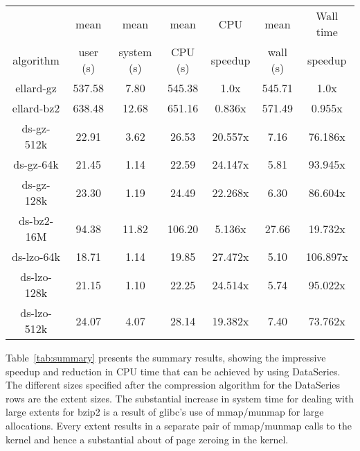 \documentclass{acm_proc_article-sp}
\begin{document}
\begin{table*}
\centering
\begin{tabular}{|c|c|c|c|c|c|c|} \hline
            & mean     & mean       & mean     & CPU     & mean     & Wall time \\
algorithm   & user (s) & system (s) & CPU (s)  & speedup & wall (s) & speedup  \\ \hline
ellard-gz   & 537.58    &  7.80     & 545.38   &  1.0x   & 545.71   &   1.0x   \\
ellard-bz2  & 638.48    & 12.68     & 651.16   &  0.836x & 571.49   &   0.955x \\
\hline
ds-gz-512k  &  22.91    &  3.62     &  26.53   & 20.557x &   7.16   &  76.186x \\
ds-gz-64k   &  21.45    &  1.14     &  22.59   & 24.147x &   5.81   &  93.945x \\
ds-gz-128k  &  23.30    &  1.19     &  24.49   & 22.268x &   6.30   &  86.604x \\
\hline
ds-bz2-16M  &  94.38    & 11.82     & 106.20   &  5.136x &  27.66   &  19.732x \\
ds-lzo-64k  &  18.71    &  1.14     &  19.85   & 27.472x &   5.10   & 106.897x \\
ds-lzo-128k &  21.15    &  1.10     &  22.25   & 24.514x &   5.74   &  95.022x \\
ds-lzo-512k &  24.07    &  4.07     &  28.14   & 19.382x &   7.40   &  73.762x \\ \hline
\end{tabular}

\caption{Summary of performance results for the two analysis programs
operating on a variety of input files.  The analysis was run over the
anon-home04-011118-* files.  For the ellard \texttt{nfsscan} program
the text files were compressed with either gz or bz2.  For the
DataSeries \texttt{ellardanalysis} program, the DataSeries files were
compressed with either gz, bz2, or lzo, and used various extent sizes
as specified.  CPU and wall time are both relative to ellard-gz.}

\label{tab:summary}
\end{table*}


Table~\ref{tab:summary} presents the summary results, showing the
impressive speedup and reduction in CPU time that can be achieved by
using DataSeries.  The different sizes specified after the compression
algorithm for the DataSeries rows are the extent sizes. 
The substantial increase in system time for dealing
with large extents for bzip2 is a result of glibc's use of mmap/munmap
for large allocations.  Every extent results in a separate pair of
mmap/munmap calls to the kernel and hence a substantial about of page
zeroing in the kernel.  
\end{document}
